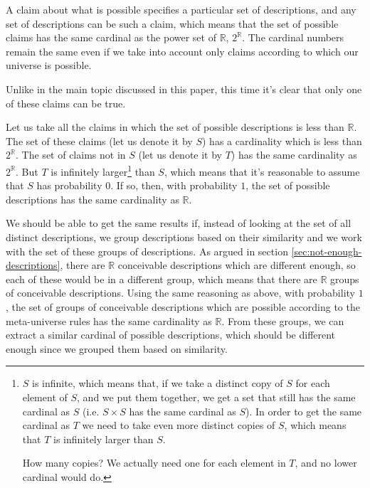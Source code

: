 \documentclass[a4paper
]{article}
\def\reale{\mathbb{R}}
\newcommand{\paper}[1]{paper}
\begin{document}
A claim about what is possible specifies a particular set of descriptions,
and any set of descriptions can be such a claim,
which means that the set of possible claims has the same cardinal as
the power set of $\reale$, $2^\reale$.
The cardinal numbers remain the same even if we take into account only claims
according to which our universe is possible.

Unlike in the main topic discussed in this
\paper{}, this time it's clear that only one of these claims can be true.


Let us take all the claims in which the set of possible descriptions
is less than $\reale$.
The set of these claims (let us denote it by $S$)
has a cardinality which is less than $2^\reale$.
The set of claims not in $S$ (let us denote it by $T$) has the same cardinality
as $2^\reale$. But $T$ is infinitely larger\footnote{
  $S$ is infinite, which means that, if we take a distinct copy of $S$ for each
  element of $S$, and we put them together, we get a set that still has the same
  cardinal as $S$ (i.e. $S\times S$ has the same cardinal as $S$). In order to
  get the same cardinal as $T$ we need to take even more distinct copies of $S$,
  which means that $T$ is infinitely larger than $S$.

  How many copies? We actually need one for each element in $T$, and no lower
  cardinal would do.
} than $S$, which means that it's reasonable to assume that $S$ has probability $0$.
If so, then, with probability $1$, the set of possible descriptions has the same
cardinality as $\reale$.

We should be able to get the same results if, instead of looking at the set
of all distinct descriptions, we group descriptions based on their similarity
and we work with the set of these groups of descriptions.
As argued in section \ref{sec:not-enough-descriptions},
there are $\reale$ conceivable descriptions which are different
enough, so each of these would be in a different group, which means that
there are $\reale$ groups of conceivable descriptions.
Using the same reasoning as above, with probability $1$, the set of groups of
conceivable descriptions which are possible according to the meta-universe
rules has the same cardinality as $\reale$.
From these groups, we can extract a similar cardinal of
possible descriptions, which should be different enough since we grouped them
based on similarity.
\end{document}
